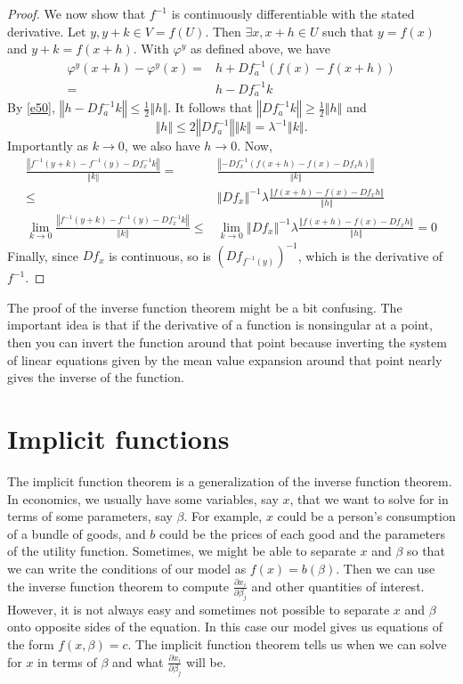 \documentclass[12pt,reqno]{amsart}
\theoremstyle{definition}
\newcommand{\norm}[1]{\left\Vert {#1} \right\Vert}
\renewcommand{\to}{{\rightarrow}}
\begin{document}
\begin{proof}
  We now show that $f^{-1}$ is continuously differentiable with the
  stated derivative. Let $y, y+k \in V = f(U)$. Then $\exists x, x+h
  \in U$ such that $y = f(x)$ and $y+k = f(x+h)$. With $\varphi^y$ as
  defined above, we have
  \begin{align*}
    \varphi^y(x+h) - \varphi^y(x) = & h + Df_a^{-1}(f(x) - f(x+h))  \\
    = & h - Df_a^{-1} k
  \end{align*}
  By \ref{e50}, $\norm{h - Df_a^{-1} k} \leq \frac{1}{2} \norm{h}$. It
  follows that $\norm{Df_a^{-1} k} \geq \frac{1}{2} \norm{h}$ and 
  \[ \norm{h} \leq 2 \norm{Df_a^{-1}} \norm{k} = \lambda^{-1}
  \norm{k}. \]
  Importantly as $k \to 0$, we also have $h \to 0$. Now, 
  \begin{align*}
    \frac{\norm{f^{-1} (y+k) - f^{-1}(y) - Df_x^{-1} k }}{\norm{k}}
    = & \frac{\norm{-Df_x^{-1}(f(x+h) - f(x) - Df_x h)}}{\norm{k}}
    \\
    \leq & \norm{Df_x}^{-1}\lambda \frac{\norm{f(x+h) - f(x) - Df_x
        h}}{\norm{h}} \\
    \lim_{k \to 0} \frac{\norm{f^{-1} (y+k) - f^{-1}(y) - Df_x^{-1} k
      }}{\norm{k}} \leq & \lim_{k \to 0} \norm{Df_x}^{-1}\lambda
    \frac{\norm{f(x+h) - f(x) - Df_x h}}{\norm{h}} = 0
  \end{align*}
  Finally, since $Df_x$ is continuous, so is $(Df_{f^{-1}(y)})^{-1}$,
  which is the derivative of $f^{-1}$.  
\end{proof}
The proof of the inverse function theorem might be a bit
confusing. The important idea is that if the derivative of a function
is nonsingular at a point, then you can invert the function around
that point because inverting the system of linear equations given by
the mean value expansion around that point nearly gives the inverse of
the function. 

\section{Implicit functions}

The implicit function theorem is a generalization of the inverse
function theorem. In economics, we usually have some variables, say
$x$, that we want to solve for in terms of some parameters, say
$\beta$. For example, $x$ could be a person's consumption of a bundle of
goods, and $b$ could be the prices of each good and the parameters of
the utility function. Sometimes, we might be able to separate $x$ and
$\beta$ so that we can write the conditions of our model as $f(x) =
b(\beta)$. Then we can use the inverse function theorem to compute
$\frac{\partial x_i}{  \partial \beta_j}$ and other quantities of
interest. However, it is not always easy and sometimes not possible to
separate $x$ and $\beta$ onto opposite sides of the equation. In this
case our model gives us equations of the form $f(x,\beta) = c$. The
implicit function theorem tells us when we can solve for $x$ in terms
of $\beta$ and what $\frac{\partial x_i}{\partial \beta_j}$ will be.
\end{document}
